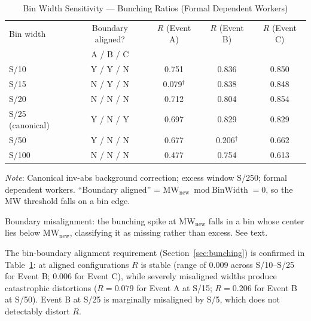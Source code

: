 \documentclass[12pt]{article}
\begin{document}
\begin{table}[H]
\centering
\caption{Bin Width Sensitivity --- Bunching Ratios (Formal Dependent Workers)}
\label{tab:binwidth}
\begin{threeparttable}
\small
\begin{tabular}{lcccc}
\toprule
Bin width & Boundary aligned? & $R$ (Event A) & $R$ (Event B) & $R$ (Event C) \\
          & A / B / C         &               &               &               \\
\midrule
S/10  & Y / Y / N & 0.751 & 0.836 & 0.850 \\
S/15  & N / Y / N & 0.079$^{\dagger}$ & 0.838 & 0.848 \\
S/20  & N / N / N & 0.712 & 0.804 & 0.854 \\
S/25 (canonical) & Y / N / Y & 0.697 & 0.829 & 0.829 \\
S/50  & Y / N / N & 0.677 & 0.206$^{\dagger}$ & 0.662 \\
S/100 & N / N / N & 0.477 & 0.754 & 0.613 \\
\bottomrule
\end{tabular}
\begin{tablenotes}
\small
\item \textit{Note}: Canonical inv-abs background correction; excess window S/250; formal dependent workers. ``Boundary aligned'' = $\text{MW}_\text{new} \bmod \text{BinWidth} = 0$, so the MW threshold falls on a bin edge.
\item[$\dagger$] Boundary misalignment: the bunching spike at $\text{MW}_\text{new}$ falls in a bin whose center lies below $\text{MW}_\text{new}$, classifying it as missing rather than excess. See text.
\end{tablenotes}
\end{threeparttable}
\end{table}

The bin-boundary alignment requirement (Section~\ref{sec:bunching}) is confirmed in Table~\ref{tab:binwidth}: at aligned configurations $R$ is stable (range of 0.009 across S/10--S/25 for Event B; 0.006 for Event C), while severely misaligned widths produce catastrophic distortions ($R = 0.079$ for Event A at S/15; $R = 0.206$ for Event B at S/50). Event B at S/25 is marginally misaligned by S/5, which does not detectably distort $R$.
\end{document}
